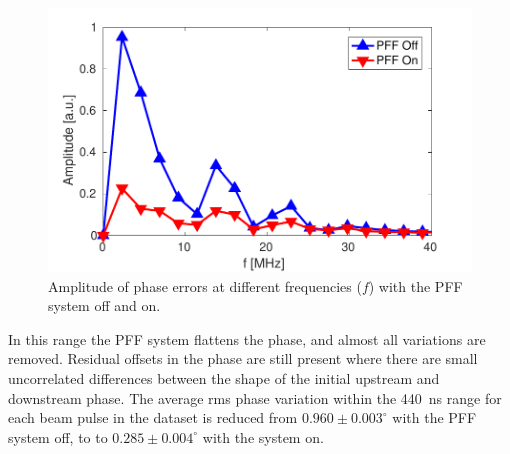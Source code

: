 \documentclass[%
 reprint,
superscriptaddress,
 amsmath,amssymb,
 prl,
]{revtex4-1}
\begin{document}

\begin{figure}
	\includegraphics[width=\columnwidth]{figs/fft}%
	\caption{\label{fig:fft}Amplitude of phase errors at different frequencies 
		(\(f\)) with the PFF system off and on.}
\end{figure}

In this range the PFF system flattens the phase, 
and almost all variations are removed. Residual offsets in the phase are still 
present where there are small uncorrelated differences between the shape of the 
initial upstream and downstream phase. 
The average rms phase variation within the 440~ns range 
for each beam pulse in the dataset is reduced from \(0.960\pm0.003^\circ\) with 
the PFF system off, to to \(0.285\pm0.004^\circ\) with the system on.
\end{document}
